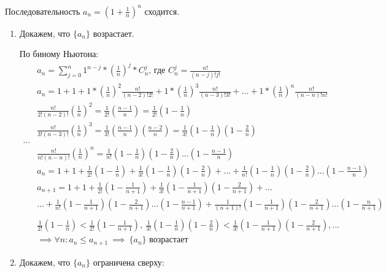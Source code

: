 \documentclass{article}
\begin{document}

\theorem 

Последовательность $a_n=\left(1+\frac{1}{n}\right)^n$ сходится.

\proof

\begin{enumerate}
    \item Докажем, что $\{a_n\}$ возрастает.

    По биному Ньютона:
    \begin{align*}
       & a_n=\sum\limits_{j=0}^n 1^{n-j}*\left(\frac{1}{n}\right)^j*C^j_n \text{, где  } C^j_n=\frac{n!}{(n-j)!j!} \\  
        & a_n=1+1+1*\left(\frac{1}{n}\right)^2\frac{n!}{(n-2)!2!}+1*\left(\frac{1}{n}\right)^3\frac{n!}{(n-3)!3!}+...+1*\left(\frac{1}{n}\right)^n\frac{n!}{(n-n)!n!}
        \\
        & \frac{n!}{2!(n-2)!}\left(\frac{1}{n}\right)^2=\frac{1}{2!}\left(\frac{n-1}{n}\right)=\frac{1}{2!}\left(1-\frac{1}{n}\right)
        \\
        & \frac{n!}{3!(n-3)!}\left(\frac{1}{n}\right)^3=\frac{1}{3!}\left(\frac{n-1}{n}\right)\left(\frac{n-2}{n}\right)=\frac{1}{3!}\left(1-\frac{1}{n}\right)\left(1-\frac{2}{n}\right)
        \\ 
        \text{...}
        \\
        & \frac{n!}{n!(n-n)!}\left(\frac{1}{n}\right)^n=\frac{1}{n!}\left(1-\frac{1}{n}\right)\left(1-\frac{2}{n}\right) \text{...} \left(1-\frac{n-1}{n}\right)
        \\
        & a_n=1+1+\frac{1}{2!}\left(1-\frac{1}{n}\right)+\frac{1}{3!}\left(1-\frac{1}{n}\right)\left(1-\frac{2}{n}\right)+\text{...}+\frac{1}{n!}\left(1-\frac{1}{n}\right)\left(1-\frac{2}{n}\right) \text{...} \left(1-\frac{n-1}{n}\right)
        \\
        & a_{n+1}=1+1+\frac{1}{2!}\left(1-\frac{1}{n+1}\right)+\frac{1}{3!}\left(1-\frac{1}{n+1}\right)\left(1-\frac{2}{n+1}\right)+\text{...} \\
        & \text{...}+\frac{1}{n!}\left(1-\frac{1}{n+1}\right)\left(1-\frac{2}{n+1}\right) \text{...} \left(1-\frac{n-1}{n+1}\right)+\frac{1}{(n+1)!}\left(1-\frac{1}{n+1}\right)\left(1-\frac{2}{n+1}\right) \text{...} \left(1-\frac{n}{n+1}\right)
        \\
        \\
        & \frac{1}{2!}\left(1-\frac{1}{n}\right)<\frac{1}{2!}\left(1-\frac{1}{n+1}\right), \ \frac{1}{3!}\left(1-\frac{1}{n}\right)\left(1-\frac{2}{n}\right)<\frac{1}{3!}\left(1-\frac{1}{n+1}\right)\left(1-\frac{2}{n+1}\right), \text{...}
        \\
        & \implies \forall n: a_n\leq a_{n+1} \ \implies \ \{a_n\} \text{ возрастает}
    \end{align*}
    \item Докажем, что $\{a_n\}$ ограничена сверху:
    

\end{enumerate}
\end{document}
